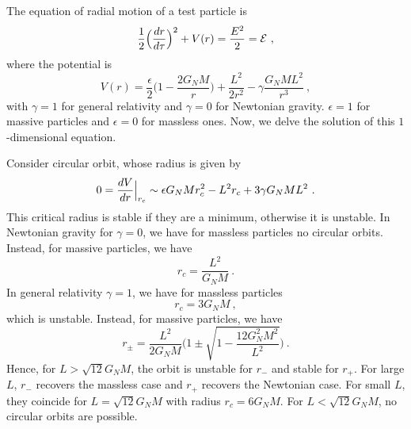     The equation of radial motion of a test particle is 
    \begin{equation*}
        \frac{1}{2} \Big ( \frac{dr}{d\tau} \Big )^2 + V(r) = \frac{E^2}{2} = \mathcal E ~,
    \end{equation*}
    where the potential is 
    \begin{equation*}
        V(r) = \frac{\epsilon}{2} \Big ( 1 - \frac{2 G_N M}{r} \Big) + \frac{L^2}{2r^2} - \gamma \frac{G_N M L^2}{r^3} ~,
    \end{equation*}
    with $\gamma = 1$ for general relativity and $\gamma = 0$ for Newtonian gravity. $\epsilon = 1$ for massive particles and $\epsilon = 0$ for massless ones. Now, we delve the solution of this $1$-dimensional equation.

    Consider circular orbit, whose radius is given by 
    \begin{equation*}
        0 = \frac{dV}{dr} \Big \vert_{r_c} \sim \epsilon G_N M r_c^2 - L^2 r_c + 3 \gamma G_N M L^2 ~.
    \end{equation*}
    This critical radius is stable if they are a minimum, otherwise it is unstable.
    In Newtonian gravity for $\gamma = 0$, we have for massless particles no circular orbits. Instead, for massive particles, we have
    \begin{equation*}
        r_c = \frac{L^2}{G_N M} ~.
    \end{equation*}
    In general relativity $\gamma = 1$, we have for massless particles 
    \begin{equation*}
        r_c = 3 G_N M ~,
    \end{equation*}
    which is unstable. Instead, for massive particles, we have 
    \begin{equation*}
        r_\pm = \frac{L^2}{2 G_N M} \Big ( 1 \pm \sqrt{1 - \frac{12 G_N^2 M^2}{L^2}} \Big ) ~.
    \end{equation*}
    Hence, for $L > \sqrt{12} G_N M$, the orbit is unstable for $r_-$ and stable for $r_+$. For large $L$, $r_-$ recovers the massless case and $r_+$ recovers the Newtonian case. For small $L$, they coincide for $L = \sqrt{12} G_N M$ with radius $r_c = 6 G_N M$. For $L < \sqrt{12} G_N M$, no circular orbits are possible.

